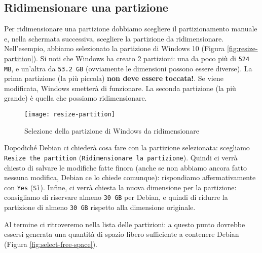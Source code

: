 \subsection{Ridimensionare una partizione}
Per ridimensionare una partizione dobbiamo scegliere il partizionamento manuale e, nella schermata successiva, scegliere la partizione da ridimensionare. Nell'esempio, abbiamo selezionato la partizione di Windows 10 (Figura \vref{fig:resize-partition}). Si noti che Windows ha creato 2 partizioni: una da poco più di \texttt{524 MB}, e un'altra da \texttt{53.2 GB} (ovviamente le dimensioni possono essere diverse). La prima partizione (la più piccola) \textbf{non deve essere toccata!}. Se viene modificata, Windows smetterà di funzionare. La seconda partizione (la più grande) è quella che possiamo ridimensionare.

\begin{figure}[ht]
	\centering
	\texttt{[image: resize-partition]}
	\caption{Selezione della partizione di Windows da ridimensionare}
	\label{fig:resize-partition}
\end{figure}

Dopodiché Debian ci chiederà cosa fare con la partizione selezionata: scegliamo \texttt{Resize the partition} (\texttt{Ridimensionare la partizione}). Quindi ci verrà chiesto di salvare le modifiche fatte finora (anche se non abbiamo ancora fatto nessuna modifica, Debian ce lo chiede comunque): rispondiamo affermativamente con \texttt{Yes} (\texttt{Sì}). Infine, ci verrà chiesta la nuova dimensione per la partizione: consigliamo di riservare almeno \texttt{30 GB} per Debian, e quindi di ridurre la partizione di almeno \texttt{30 GB} rispetto alla dimensione originale.

Al termine ci ritroveremo nella lista delle partizioni: a questo punto dovrebbe essersi generata una quantità di spazio libero sufficiente a contenere Debian (Figura \vref{fig:select-free-space}).
